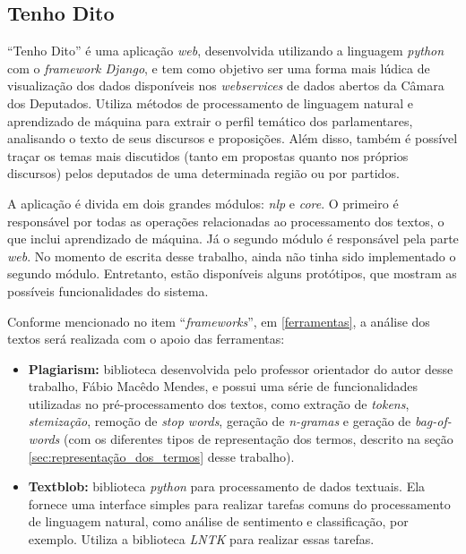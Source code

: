 \clearpage

\subsection{Tenho Dito}

``Tenho Dito'' é uma aplicação \textit{web}, desenvolvida utilizando a linguagem \textit{python} com o \textit{framework Django}, e tem como objetivo ser uma forma mais lúdica de visualização dos dados disponíveis nos \textit{webservices} de dados abertos da Câmara dos Deputados. Utiliza métodos de processamento de linguagem natural e aprendizado de máquina para extrair o perfil temático dos parlamentares, analisando o texto de seus discursos e proposições. Além disso, também é possível traçar os temas mais discutidos (tanto em propostas quanto nos próprios discursos) pelos deputados de uma determinada região ou por partidos.

A aplicação é divida em dois grandes módulos: \textit{nlp} e \textit{core}. O primeiro é responsável por todas as operações relacionadas ao processamento dos textos, o que inclui aprendizado de máquina. Já o segundo módulo é responsável pela parte \textit{web}. No momento de escrita desse trabalho, ainda não tinha sido implementado o segundo módulo. Entretanto, estão disponíveis alguns protótipos, que mostram as possíveis funcionalidades do sistema.

Conforme mencionado no item ``\textit{frameworks}'', em \ref{ferramentas}, a análise dos textos será realizada com o apoio das ferramentas:

\begin{itemize}
    \item \textbf{Plagiarism:} biblioteca desenvolvida pelo professor orientador do autor desse trabalho, Fábio Macêdo Mendes, e possui uma série de funcionalidades utilizadas no pré-processamento dos textos, como extração de \textit{tokens}, \textit{stemização}, remoção de \textit{stop words}, geração de \textit{n-gramas} e geração de \textit{bag-of-words} (com os diferentes tipos de representação dos termos, descrito na seção \ref{sec:representação_dos_termos} desse trabalho).
    \item \textbf{Textblob:} biblioteca \textit{python} para processamento de dados textuais. Ela fornece uma interface simples para realizar tarefas comuns do processamento de linguagem natural, como análise de sentimento e classificação, por exemplo. Utiliza a biblioteca \textit{LNTK} para realizar essas tarefas.
\end{itemize}

